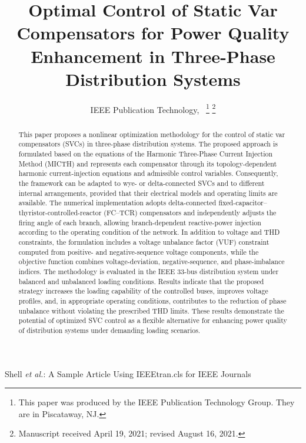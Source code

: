 \documentclass[journal]{IEEEtran}
\begin{document}
\title{Optimal Control of Static Var Compensators for Power Quality Enhancement in Three-Phase Distribution Systems}

\author{IEEE Publication Technology,~
\thanks{This paper was produced by the IEEE Publication Technology Group. They are in Piscataway, NJ.}%
\thanks{Manuscript received April 19, 2021; revised August 16, 2021.}}

%
{Shell \MakeLowercase{\textit{et al.}}: A Sample Article Using IEEEtran.cls for IEEE Journals}

\IEEEpubid{}

\maketitle

\begin{abstract}
This paper proposes a nonlinear optimization methodology for the control of static var compensators (SVCs) in three-phase distribution systems. The proposed approach is formulated based on the equations of the Harmonic Three-Phase Current Injection Method (MICTH) and represents each compensator through its topology-dependent harmonic current-injection equations and admissible control variables. Consequently, the framework can be adapted to wye- or delta-connected SVCs and to different internal arrangements, provided that their electrical models and operating limits are available. The numerical implementation adopts delta-connected fixed-capacitor--thyristor-controlled-reactor (FC--TCR) compensators and independently adjusts the firing angle of each branch, allowing branch-dependent reactive-power injection according to the operating condition of the network. In addition to voltage and THD constraints, the formulation includes a voltage unbalance factor (VUF) constraint computed from positive- and negative-sequence voltage components, while the objective function combines voltage-deviation, negative-sequence, and phase-imbalance indices. The methodology is evaluated in the IEEE 33-bus distribution system under balanced and unbalanced loading conditions. Results indicate that the proposed strategy increases the loading capability of the controlled buses, improves voltage profiles, and, in appropriate operating conditions, contributes to the reduction of phase unbalance without violating the prescribed THD limits. These results demonstrate the potential of optimized SVC control as a flexible alternative for enhancing power quality of distribution systems under demanding loading scenarios.
\end{abstract}
\end{document}
